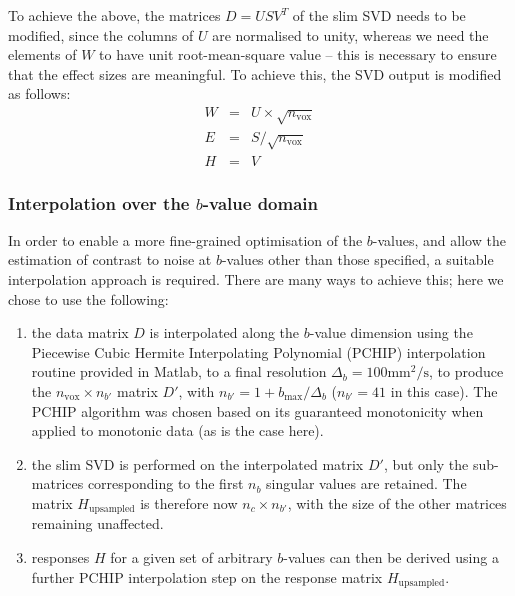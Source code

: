 \documentclass{article}
\newcommand{\nvox}{n_{\textrm{vox}}}
\newcommand{\mms}{\textrm{mm}^2/\textrm{s}}
\begin{document}
To achieve the above, the matrices $D = USV^T$ of the slim SVD needs to be
modified, since the columns of $U$ are normalised to unity, whereas we need the
elements of $W$ to have unit root-mean-square value -- this is necessary to
ensure that the effect sizes are meaningful. To achieve this, the SVD
output is modified as follows: 
\begin{eqnarray}
W & = & U \times \sqrt{\nvox} \\
E & = & S / \sqrt{\nvox} \\
H & = & V
\end{eqnarray}


\subsubsection{Interpolation over the $b$-value domain}
In order to enable a more fine-grained optimisation of the $b$-values,
and allow the estimation of contrast to noise at $b$-values other than those
specified, a suitable interpolation approach is required. There are many ways
to achieve this; here we chose to use the following: 
\begin{enumerate}
\item the data matrix $D$ is interpolated along the $b$-value dimension using
the Piecewise Cubic Hermite Interpolating Polynomial (PCHIP) interpolation
routine provided in Matlab, to a final resolution $\Delta_b = 100 \mms$, to
produce the $\nvox \times n_{b'}$ matrix $D'$, with $n_{b'} = 1 + b_{\textrm{max}} / \Delta_b$ 
($n_{b'} = 41$ in this case). The PCHIP algorithm was chosen based on its
guaranteed monotonicity when applied to monotonic data (as is the case here).
\item the slim SVD is performed on the interpolated matrix $D'$, but only the
sub-matrices corresponding to the first $n_b$ singular values are retained. The
matrix $H_{\textrm{upsampled}}$ is therefore now $n_c \times n_{b'}$, with the size of the other
matrices remaining unaffected.
\item responses $H$ for a given set of arbitrary $b$-values can then be derived
using a further PCHIP interpolation step on the response matrix $H_{\textrm{upsampled}}$.
\end{enumerate} 
\end{document}
